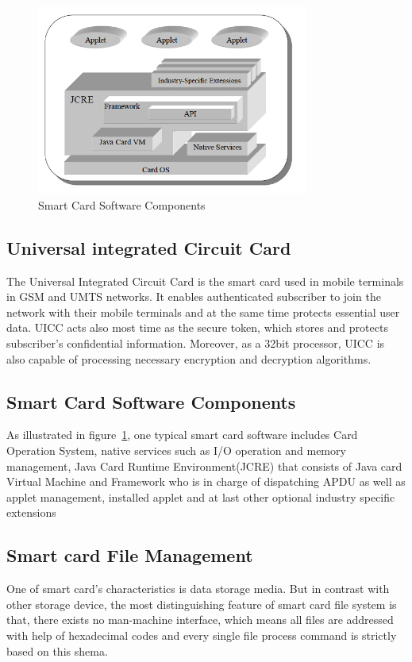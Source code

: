 \begin{figure}[!htbp]
	\centering
	\includegraphics[width=0.8\textwidth]{scc.jpg}
		\caption{Smart Card Software Components\cite{jcadg}}
	\label{fig:scc}
\end{figure}

\subsection{Universal integrated Circuit Card}
The Universal Integrated Circuit Card is the smart card used in mobile terminals in GSM and UMTS networks. It enables authenticated subscriber to join the network with their mobile terminals and at the same time protects essential user data. UICC acts  also most time as the secure token, which stores and protects subscriber's confidential information. Moreover, as a 32bit processor, UICC is also capable of processing necessary  encryption and  decryption algorithms\cite{uiccDef}.

\subsection{Smart Card Software Components}
As illustrated in figure~\ref{fig:scc}, one typical smart card software includes Card Operation System, native services such as I/O operation and memory management, Java Card Runtime Environment(JCRE) that consists of Java card  Virtual Machine and Framework who is in charge of dispatching APDU as well as applet management, installed applet and at last other optional industry specific extensions\cite{jcadg}

\subsection{Smart card File Management}
One of smart card's characteristics is data storage media. But in contrast with other storage device, the most distinguishing feature of smart card file system is that, there exists no man-machine interface\cite{handbuch}, which means all files are addressed with help of hexadecimal codes and every single file process command is strictly based on this shema.

